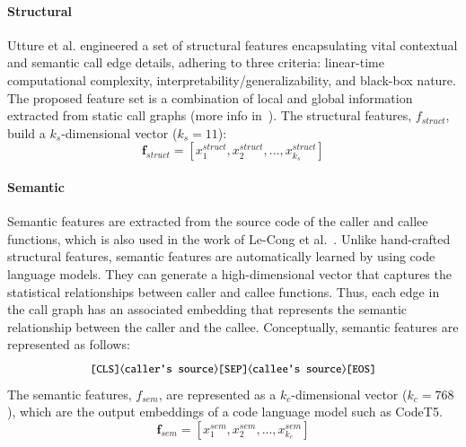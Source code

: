 \paragraph{Structural}
Utture et al. \cite{utture2022striking} engineered a set of structural features encapsulating vital contextual and semantic call edge details, adhering to three criteria: linear-time computational complexity, interpretability/generalizability, and black-box nature. The proposed feature set is a combination of local and global information extracted from static call graphs (more info in~\cite{utture2022striking}). The structural features, $f_{struct}$, build a $k_{s}$-dimensional vector ($k_{s}=11$):
\begin{equation}
\mathbf{f}_{struct} = [x_{1}^{struct}, x_{2}^{struct}, ..., x_{k_{s}}^{struct}]
\end{equation}


\paragraph{Semantic}
Semantic features are extracted from the source code of the caller and callee functions, which is also used in the work of Le-Cong et al.~\cite{le2022autopruner}. Unlike hand-crafted structural features, semantic features are automatically learned by using code language models. They can generate a high-dimensional vector that captures the statistical relationships between caller and callee functions. Thus, each edge in the call graph has an associated embedding that represents the semantic relationship between the caller and the callee. Conceptually, semantic features are represented as follows:
\begin{equation}
\small
\texttt{[CLS]} \langle \texttt{caller's source} \rangle \texttt{[SEP]} \langle \texttt{callee's source} \rangle \texttt{[EOS]}
\end{equation}
The semantic features, $f_{sem}$, are represented as a $k_{c}$-dimensional vector ($k_{c} = 768$), which are the output embeddings of a code language model such as CodeT5.
\begin{equation}
\mathbf{f}_{sem} = [x_{1}^{sem}, x_{2}^{sem}, ..., x_{k_{c}}^{sem}]
\end{equation}

